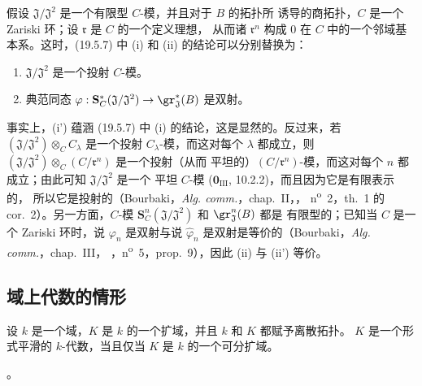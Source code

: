 \begin{remark}[19.5.8]
\label{0.19.5.8-fr}
假设 $\mathfrak J/\mathfrak J^2$ 是一个有限型 $C$-模，并且对于 $B$ 的拓扑所
诱导的商拓扑，$C$ 是一个 Zariski 环；设 $\mathfrak r$ 是 $C$ 的一个定义理想，
从而诸 $\mathfrak r^n$ 构成 $0$ 在 $C$ 中的一个邻域基本系。这时，(19.5.7) 中
(i) 和 (ii) 的结论可以分别替换为：
\begin{enumerate}
  \item[\rm(i')] $\mathfrak J/\mathfrak J^2$ 是一个投射 $C$-模。
  \item[\rm(ii')] 典范同态
  $\varphi:\mathbf S_C^*(\mathfrak J/\mathfrak J^2)
  \to\gr_{\mathfrak J}^*(B)$ 是双射。
\end{enumerate}
事实上，(i') 蕴涵 (19.5.7) 中 (i) 的结论，这是显然的。反过来，若
$(\mathfrak J/\mathfrak J^2)\otimes_C C_\lambda$ 是一个投射
$C_\lambda$-模，而这对每个 $\lambda$ 都成立，则
$(\mathfrak J/\mathfrak J^2)\otimes_C(C/\mathfrak r^n)$ 是一个投射（从而
平坦的）$(C/\mathfrak r^n)$-模，而这对每个 $n$ 都成立；由此可知
$\mathfrak J/\mathfrak J^2$ 是一个
平坦 $C$-模 ($\mathbf 0_{\mathrm{III}}$, 10.2.2)，而且因为它是有限表示的，
所以它是投射的（Bourbaki，\emph{Alg. comm.}，chap.~II，，
n\textsuperscript{o}~2，th.~1 的 cor.~2）。另一方面，$C$-模
$\mathbf S_C^n(\mathfrak J/\mathfrak J^2)$ 和 $\gr_{\mathfrak J}^n(B)$ 都是
有限型的；已知当 $C$ 是一个 Zariski 环时，说 $\varphi_n$ 是双射与说
$\widehat\varphi_n$ 是双射是等价的（Bourbaki，\emph{Alg. comm.}，chap.~III，
，n\textsuperscript{o}~5，prop.~9），因此 (ii) 与 (ii') 等价。
\end{remark}

\subsection{域上代数的情形}
\label{subsection:0.19.6-fr}

\begin{theorem}[19.6.1 (Cohen)]
\label{0.19.6.1-fr}
设 $k$ 是一个域，$K$ 是 $k$ 的一个扩域，并且 $k$ 和 $K$ 都赋予离散拓扑。
$K$ 是一个形式平滑的 $k$-代数，当且仅当 $K$ 是 $k$ 的一个可分扩域。
\end{theorem}
。

